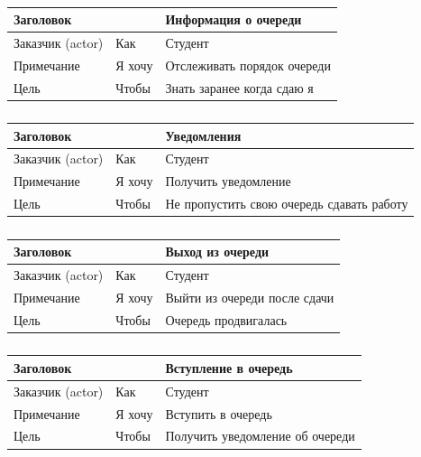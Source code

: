 \begin{table}[h!tp]
	\centering
	\caption{}
	\label{table:user_story:info:stud}
	\begin{tabular}{|l|l|l|}
		\hline \multicolumn{2}{|l|}{Заголовок} & Информация о очереди\\ \hline
		Заказчик (actor) & Как & Студент \\ \hline
		Примечание & Я хочу & Отслеживать порядок очереди\\ \hline
		Цель & Чтобы & Знать заранее когда сдаю я\\ \hline
	\end{tabular}
\end{table}
\begin{table}[h!tp]
	\centering
	\caption{}
	\label{table:user_story:notify}
	\begin{tabular}{|l|l|l|}
		\hline \multicolumn{2}{|l|}{Заголовок} & Уведомления\\ \hline
		Заказчик (actor) & Как & Студент \\ \hline
		Примечание & Я хочу & Получить уведомление\\ \hline
		Цель & Чтобы & Не пропустить свою очередь сдавать работу\\ \hline
	\end{tabular}
\end{table}
\begin{table}[h!tp]
	\centering
	\caption{}
	\label{table:user_story:exit}
	\begin{tabular}{|l|l|l|}
		\hline \multicolumn{2}{|l|}{Заголовок} & Выход из очереди\\ \hline
		Заказчик (actor) & Как & Студент \\ \hline
		Примечание & Я хочу & Выйти из очереди после сдачи\\ \hline
		Цель & Чтобы & Очередь продвигалась\\ \hline
	\end{tabular}
\end{table}
\begin{table}[h!tp]
	\centering
	\caption{}
	\label{table:user_story:entrance}
	\begin{tabular}{|l|l|l|}
		\hline \multicolumn{2}{|l|}{Заголовок} & Вступление в очередь\\ \hline
		Заказчик (actor) & Как & Студент \\ \hline
		Примечание & Я хочу & Вступить в очередь\\ \hline
		Цель & Чтобы & Получить уведомление об очереди\\ \hline
	\end{tabular}
\end{table}
